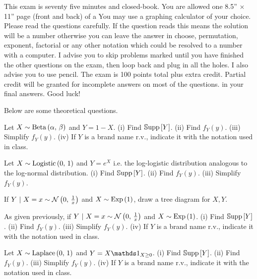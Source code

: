 \documentclass[12pt]{article}
\begin{document}
This exam is seventy five minutes and closed-book. You are allowed one 8.5'' $\times$ 11'' page (front and back) of a  You may use a graphing calculator of your choice. Please read the questions carefully. If the question reads  this means the solution will be a number otherwise you can leave the answer in choose, permutation, exponent, factorial or any other notation which could be resolved to a number with a computer. I advise you to skip problems marked  until you have finished the other questions on the exam, then loop back and plug in all the holes. I also advise you to use pencil. The exam is 100 points total plus extra credit. Partial credit will be granted for incomplete answers on most of the questions.  in your final answers. Good luck!

\pagebreak

\problem Below are some theoretical questions.

\benum



 Let $X \sim \mathrm{Beta}\left(\alpha,\,\beta\right)$ and $Y = 1 - X$. (i) Find $\mathbb{S}\text{upp}\left[Y\right]$. (ii) Find $f_Y(y)$. (iii) Simplify $f_Y(y)$. (iv) If $Y$ is a brand name r.v., indicate it with the notation used in class. 

 Let $X \sim \mathrm{Logistic}\left(0,\,1\right)$ and $Y = e^X$ i.e. the log-logistic distribution analogous to the log-normal distribution. (i) Find $\mathbb{S}\text{upp}\left[Y\right]$. (ii) Find $f_Y(y)$. (iii) Simplify $f_Y(y)$. 

 If $Y~|~X = x \sim \mathcal{N}\left(0,\,\frac{1}{x}\right)$ and $X \sim \mathrm{Exp}\left(1\right)$, draw a tree diagram for $X,Y$.

 As given previously, if $Y~|~X = x \sim \mathcal{N}\left(0,\,\frac{1}{x}\right)$ and $X \sim \mathrm{Exp}\left(1\right)$. (i) Find $\mathbb{S}\text{upp}\left[Y\right]$. (ii) Find $f_Y(y)$. (iii) Simplify $f_Y(y)$. (iv) If $Y$ is a brand name r.v., indicate it with the notation used in class. 


 Let $X \sim \mathrm{Laplace}\left(0,\,1\right)$ and $Y = X\indic{X \geq 0}$. (i) Find $\mathbb{S}\text{upp}\left[Y\right]$. (ii) Find $f_Y(y)$. (iii) Simplify $f_Y(y)$. (iv) If $Y$ is a brand name r.v., indicate it with the notation used in class. 
\end{document}
